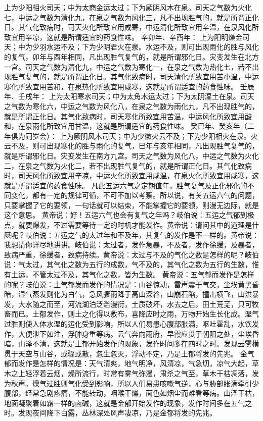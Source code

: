 \documentclass[a4paper,12pt,UTF8,twoside]{ctexbook}
\begin{document}
上为少阳相火司天；中为太商金运太过；下为厥阴风木在泉。司天之气数为火化七，中运之气数为清化九，在泉之气数为风化三，凡不出现胜气的，就是所谓正化日。其气化致病时，司天火化所致宜用咸寒，中运清化所致宜用辛温，在泉风化所致宜用辛凉，这就是所谓适宜的药食性味。
辛卯年、辛酉年：
上为阳明燥金司天；中为少羽水运不及；下为少阴君火在泉。水运不及，则可出现雨化的胜与风化的复气，卯年与酉年相同，凡出现胜气复气的，就是所谓邪化日。灾变发生在北方一宫。司天之气数为清化九，中运之气数为寒化一，在泉之气数为热化七，若不出现胜气复气的，就是所谓正化日。其气化致病时，司天清化所致宜用苦小温，中运寒化所致宜用苦和，在泉热化所致宜用咸寒，这就是所谓适宜的药食性味。
壬辰年、壬戌年：
上为太阳寒水司天；中为太角木运太过；下为太阴湿土在泉。司天之气数为寒化六，中运之气数为风化八，在泉之气数为雨化九，凡不出现胜气的，就是所谓正化日。其气化致病时，司天寒化所致宜用苦温，中运风化所致宜用酸和，在泉雨化所致宜用甘温，这就是所谓适宜的药食性味。
癸巳年、癸亥年（二年俱为同岁会）：
上为厥阴风木司天；中为少徽火云不及；下为少阳相火在泉。火云不及，则可出现寒化的胜与雨化的复气，巳年与亥年相同，凡出现胜气复气的，就是所谓邪化日。灾变发生在南方九宫。司天之气数为风化八，中运之气数为火化二，在泉之气数为火化二，若不出现胜气复气的，就是所谓正化日。其气化致病时，司天风化所致宜用辛凉，中运火化所致宜用咸温，在泉火化所致宜用咸寒，这就是所谓适宜的药食性味。
凡此五运六气之定期值年，胜气复气及正化邪化的不同变化，都有一定的规律可循，不可不加以考察。所以说，有关五运六气的问题，只要掌握了它的要领，一句话就可以结束，不能掌握它的要领，则漫无边际，就是这个意思。
黄帝说：好！五运六气也会有复气之年吗？岐伯说：五运之气郁到极点，就要爆发，不过需要等待一定的时机才能发作。黄帝说：请问其中的道理是什麽呢？岐伯说：五运之气的太过年和不及年，其复气的发作是不一样的。黄帝说：我想请你详尽地讲讲。岐伯说：太过者，发作急暴，不及者，发作徐缓，及暴者，致病严重，徐缓者，致病持续。黄帝说：太过与不及的气化之数是怎样的呢？岐伯说：气太过，其气化之数为五行的成数，气不及的，其气化之数为五行的生数，惟有土运，不管太过不及，其气化之数，皆为生数。
黄帝说：五气郁而发作是怎样的呢？岐伯说：土气郁发而发作的情况是：山谷惊动，雷声震于气交，尘埃黄黑昏暗，湿气蒸发则化为白气，急风骤雨降于高山深谷，山崩石陷，撞击横飞，山洪暴发，大水随之而至，河流湖泊泛滥漫衍，土质破坏，水去之后，田土荒芜，只可牧畜而已。土郁发作，则土之化得以敷布，喜降应时之雨，万物开始生长化成。湿气过胜则使人体水湿的运化受到影响，所以人们易患心腹部胀满，呕吐霍乱，水饮发作，大便泄下如注，浮肿身重等病。云气奔向雨府，早霞应贯于朝阳之处，尘埃昏暗，山泽不清，这就是土郁开始发作的现象，发作时间多在四时之时。发现云雾横贯于天空与山谷，或骤或散，忽生忽灭，浮动不定，乃是土郁将发的先兆。
金气郁而发作是怎样的情况是：天气清爽，地气明净，风清凉，气急切，凉气大起，草木之上轻浮着云烟，燥所流行，时常有雾气弥漫，肃杀之气至，草木干枯凋落，发为秋声。燥气过胜则气化受到影响，所以人们易患咳嗽气逆，心与胁部胀满牵引少腹部，经常急剧疼痛，不能转动，咽喉干燥，面色如烟尘而难看等病。山泽干枯，地面凝聚着如霜一样的卤碱，这就是金郁开始发作的现象，发作时间多在五气之时。发现夜间降下白露，丛林深处风声凄凉，乃是金郁将发的先兆。
\end{document}
